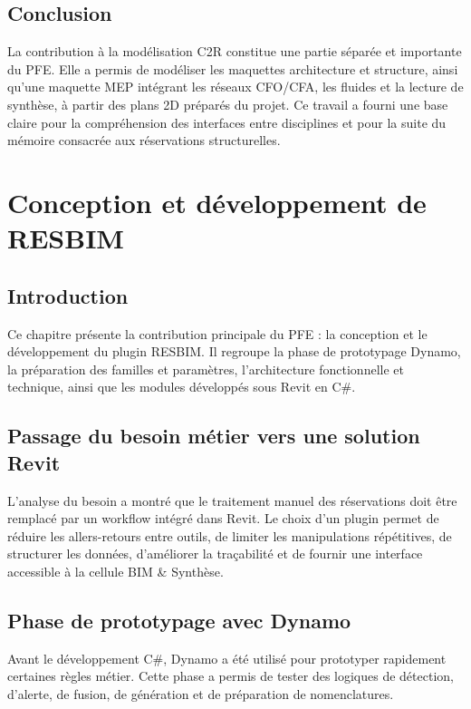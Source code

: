 \documentclass[12pt,a4paper]{report}
\begin{document}
\section{Conclusion}
La contribution à la modélisation C2R constitue une partie séparée et importante du PFE. Elle a permis de modéliser les maquettes architecture et structure, ainsi qu'une maquette MEP intégrant les réseaux CFO/CFA, les fluides et la lecture de synthèse, à partir des plans 2D préparés du projet. Ce travail a fourni une base claire pour la compréhension des interfaces entre disciplines et pour la suite du mémoire consacrée aux réservations structurelles.

\chapter{Conception et développement de RESBIM}

\section{Introduction}
Ce chapitre présente la contribution principale du PFE : la conception et le développement du plugin RESBIM. Il regroupe la phase de prototypage Dynamo, la préparation des familles et paramètres, l'architecture fonctionnelle et technique, ainsi que les modules développés sous Revit en C\#.

\section{Passage du besoin métier vers une solution Revit}
L'analyse du besoin a montré que le traitement manuel des réservations doit être remplacé par un workflow intégré dans Revit. Le choix d'un plugin permet de réduire les allers-retours entre outils, de limiter les manipulations répétitives, de structurer les données, d'améliorer la traçabilité et de fournir une interface accessible à la cellule BIM \& Synthèse.

\section{Phase de prototypage avec Dynamo}
Avant le développement C\#, Dynamo a été utilisé pour prototyper rapidement certaines règles métier. Cette phase a permis de tester des logiques de détection, d'alerte, de fusion, de génération et de préparation de nomenclatures.
\end{document}
